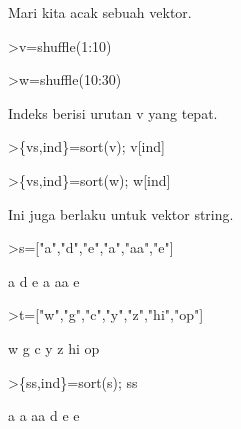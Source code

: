 \documentclass[a4paper,10pt]{article}
\begin{document}
\begin{eulernotebook}
\begin{eulercomment}
\begin{eulercomment}
\begin{eulercomment}
\begin{eulercomment}
\begin{eulercomment}
\begin{eulercomment}
\begin{eulercomment}
Mari kita acak sebuah vektor.
\end{eulercomment}
\begin{eulerprompt}
>v=shuffle(1:10)
\end{eulerprompt}
\begin{euleroutput}
  [8,  7,  9,  6,  5,  2,  1,  10,  3,  4]
\end{euleroutput}
\begin{eulerprompt}
>w=shuffle(10:30)
\end{eulerprompt}
\begin{euleroutput}
  [14,  29,  22,  15,  11,  19,  10,  30,  24,  20,  13,  16,  12,  21,
  27,  25,  26,  18,  17,  28,  23]
\end{euleroutput}
\begin{eulercomment}
Indeks berisi urutan v yang tepat.
\end{eulercomment}
\begin{eulerprompt}
>\{vs,ind\}=sort(v); v[ind]
\end{eulerprompt}
\begin{euleroutput}
  [1,  2,  3,  4,  5,  6,  7,  8,  9,  10]
\end{euleroutput}
\begin{eulerprompt}
>\{vs,ind\}=sort(w); w[ind]
\end{eulerprompt}
\begin{euleroutput}
  [10,  11,  12,  13,  14,  15,  16,  17,  18,  19,  20,  21,  22,  23,
  24,  25,  26,  27,  28,  29,  30]
\end{euleroutput}
\begin{eulercomment}
Ini juga berlaku untuk vektor string.
\end{eulercomment}
\begin{eulerprompt}
>s=["a","d","e","a","aa","e"]
\end{eulerprompt}
\begin{euleroutput}
  a
  d
  e
  a
  aa
  e
\end{euleroutput}
\begin{eulerprompt}
>t=["w","g","c","y","z","hi","op"]
\end{eulerprompt}
\begin{euleroutput}
  w
  g
  c
  y
  z
  hi
  op
\end{euleroutput}
\begin{eulerprompt}
>\{ss,ind\}=sort(s); ss
\end{eulerprompt}
\begin{euleroutput}
  a
  a
  aa
  d
  e
  e
\end{euleroutput}

\end{eulercomment}
\end{eulercomment}
\end{eulercomment}
\end{eulercomment}
\end{eulercomment}
\end{eulercomment}
\end{eulernotebook}
\end{document}
